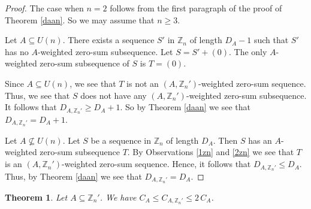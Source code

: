 \documentclass{article}[11pt]
\newtheorem{theorem}{Theorem}[section]
\theoremstyle{definition}
\begin{document}
\begin{proof}
The case when $n=2$ follows from the first paragraph of the proof of Theorem \ref{daan}. So we may assume that $n\geq 3$.

Let $A\subseteq U(n)$. There exists a sequence $S'$ in $\mathbb Z_n$ of length $D_A-1$ such that $S'$ has no $A$-weighted zero-sum subsequence. Let $S=S'+(0)$. The only $A$-weighted zero-sum subsequence of $S$ is $T=(0)$.

Since $A\subseteq U(n)$, we see that $T$ is not an $(A,\mathbb Z_n')$-weighted zero-sum sequence. Thus, we see that $S$ does not have any $(A,\mathbb Z_n')$-weighted zero-sum subsequence. It follows that $D_{A,\mathbb Z_n'}\geq D_A+1$. So by Theorem \ref{daan} we see that $D_{A,\mathbb Z_n'}=D_A+1$.

Let $A\nsubseteq U(n)$. Let $S$ be a sequence in $\mathbb Z_n$ of length $D_A$. Then $S$ has an $A$-weighted zero-sum subsequence $T$. By Observations \ref{1zn} and \ref{2zn} we see that $T$ is an $(A,\mathbb Z_n')$-weighted zero-sum sequence. Hence, it follows that $D_{A,\mathbb Z_n'}\leq D_A$. Thus, by Theorem \ref{daan} we see that $D_{A,\mathbb Z_n'}=D_A$.
\end{proof}

\begin{theorem}\label{caan}
Let $A\subseteq \mathbb Z_n'$. We have $C_A\leq C_{A,\mathbb Z_n'}\leq 2\,C_A$.
\end{theorem}
\end{document}
